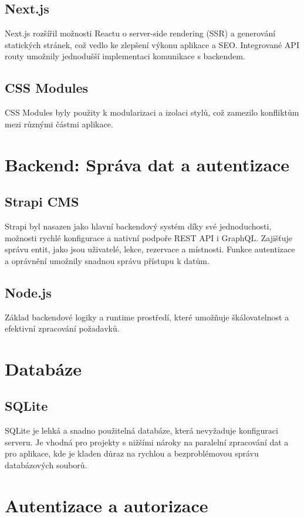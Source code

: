\documentclass[12pt, a4paper,
openright
]{report}
\begin{document}
\subsection{Next.js}
Next.js rozšířil možnosti Reactu o server-side rendering (SSR) a generování statických stránek, což vedlo ke zlepšení výkonu aplikace a SEO.
Integrované API routy umožnily jednodušší implementaci komunikace s backendem.
\subsection{CSS Modules}
    CSS Modules byly použity k modularizaci a izolaci stylů, což zamezilo konfliktům mezi různými částmi aplikace.
    
    \section{Backend: Správa dat a autentizace
} 
    
\subsection{Strapi CMS}
Strapi byl nasazen jako hlavní backendový systém díky své jednoduchosti, možnosti rychlé konfigurace a nativní podpoře REST API i GraphQL.
Zajišťuje správu entit, jako jsou uživatelé, lekce, rezervace a místnosti.
Funkce autentizace a oprávnění umožnily snadnou správu přístupu k datům.
\subsection{Node.js}
    Základ backendové logiky a runtime prostředí, které umožňuje škálovatelnost a efektivní zpracování požadavků.

    \section{Databáze} 
    
\subsection{SQLite}
SQLite je lehká a snadno použitelná databáze, která nevyžaduje konfiguraci serveru.
Je vhodná pro projekty s nižšími nároky na paralelní zpracování dat a pro aplikace, kde je kladen důraz na rychlou a bezproblémovou správu databázových souborů.
\section{Autentizace a autorizace} 
    
\end{document}
